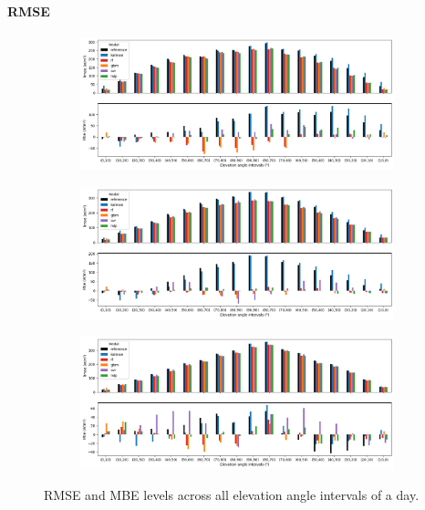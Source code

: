 \paragraph{RMSE}
\begin{figure}[htb!]
    \centering
    \begin{subfigure}{\columnwidth}
        \includegraphics[width=\columnwidth]{figures/first_study/rmse_mbe_site1.png}
    \end{subfigure}
\medskip
    \begin{subfigure}{\columnwidth}
        \includegraphics[width=\columnwidth]{figures/first_study/rmse_mbe_site3.png}
    \end{subfigure}
\medskip
    \begin{subfigure}{\columnwidth}
        \includegraphics[width=\columnwidth]{figures/first_study/rmse_mbe_site4.png}
    \end{subfigure}
    \caption[]{RMSE and MBE levels across all elevation angle intervals of a day.}
\end{figure}


